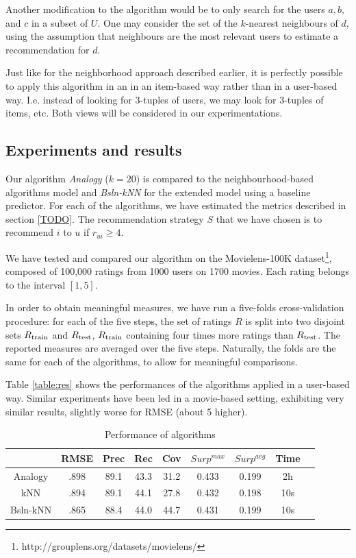 Another modification to the algorithm would be to only search for the users
$a, b,$ and $c$ in a subset of $U$. One may consider the set of the $k$-nearest
neighbours of $d$, using the assumption that neighbours are the most relevant
users to estimate a recommendation for $d$.

Just like for the neighborhood approach described earlier, it is perfectly
possible to apply this algorithm in an in an item-based way rather
than in a user-based way. I.e. instead of looking for $3$-tuples of users, we
may look for $3$-tuples of items, etc. Both views will be considered in our 
experimentations.


\subsection{Experiments and results}
\label{results}

Our algorithm \textit{Analogy} ($k=20$) is compared to the neighbourhood-based
algorithms model and \textit{Bsln-kNN} for the extended model using a baseline
predictor. For each of the algorithms, we have estimated the metrics described
in section \ref{TODO}.  The recommendation strategy $S$ that we have chosen is
to recommend $i$ to $u$ if $\hat{r}_{ui} \geq 4$.

We have tested and compared our algorithm on the Movielens-100K
dataset\footnote{http://grouplens.org/datasets/movielens/}, composed of 100,000
ratings from 1000 users on 1700 movies. Each rating belongs to the interval
$[1, 5]$.

In order to obtain meaningful measures, we have run a five-folds
cross-validation procedure: for each of the five steps, the set of ratings $R$
is split into two disjoint sets $R_{\text{train}}$ and $R_{\text{test}}$, $R_{\text{train}}$ containing
four times more ratings than $R_{\text{test}}$. The reported measures are averaged over
the five steps. Naturally, the folds are the same for each of the algorithms,
to allow for meaningful comparisons.

Table \ref{table:res} shows the performances of the algorithms applied in a
user-based way. Similar experiments have been led in a movie-based setting,
exhibiting very similar results, slightly worse for RMSE (about 5\permil
higher).

\begin{table}[ht]
\begin{tabular}{| c || c | c | c | c | c | c | c | c |}
\hline
& RMSE & Prec & Rec & Cov & $Surp^{max}$ & $Surp^{avg}$ & Time \\
\hline
Analogy   & .898 & 89.1 & 43.3 & 31.2 & 0.433 & 0.199 & 2h \\
kNN     & .894 & 89.1 & 44.1 & 27.8 & 0.432 & 0.198 & 10s \\
Bsln-kNN & .865 & 88.4 & 44.0 & 44.7 & 0.431 & 0.199 & 10s \\
\hline
\end{tabular}

\caption{Performance of algorithms}
\label{Zob}
\end{table}

